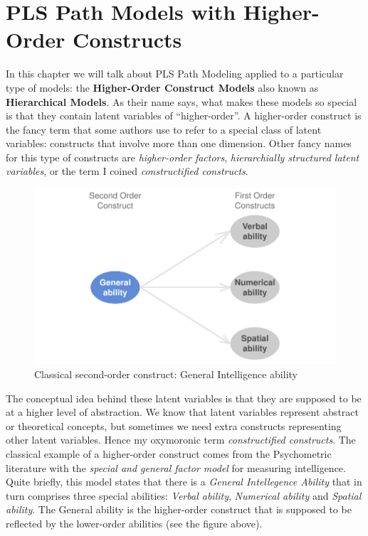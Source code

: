 \documentclass[12pt]{book}\usepackage{graphicx, color}
\newenvironment{knitrout}{}{} %
\begin{document}



\chapter{PLS Path Models with Higher-Order Constructs}
In this chapter we will talk about PLS Path Modeling applied to a particular type of models: the \textbf{Higher-Order Construct Models} also known as \textbf{Hierarchical Models}. As their name says, what makes these models so special is that they contain latent variables of ``higher-order''. A higher-order construct is the fancy term that some authors use to refer to a special class of latent variables: constructs that involve more than one dimension. Other fancy names for this type of constructs are \textit{higher-order factors}, \textit{hierarchially structured latent variables}, or the term I coined \textit{constructified constructs}.



\begin{knitrout}
\color{fgcolor}\begin{figure}[h]


{\centering \includegraphics[width=.75\linewidth,height=.4\linewidth]{figure/gen_int_sec_ord_diag} 

}

\caption[Classical second-order construct]{Classical second-order construct: General Intelligence ability\label{fig:gen_int_sec_ord_diag}}
\end{figure}


\end{knitrout}


The conceptual idea behind these latent variables is that they are supposed to be at a higher level of abstraction. We know that latent variables represent abstract or theoretical concepts, but sometimes we need extra constructs representing other latent variables. Hence my oxymoronic term \textit{constructified constructs}. The classical example of a higher-order construct comes from the Psychometric literature with the \textit{special and general factor model} for measuring intelligence. Quite briefly, this model states that there is a \textit{General Intellegence Ability} that in turn comprises three special abilities: \textit{Verbal ability}, \textit{Numerical ability} and \textit{Spatial ability}. The General ability is the higher-order construct that is supposed to be reflected by the lower-order abilities (see the figure above).
\end{document}
